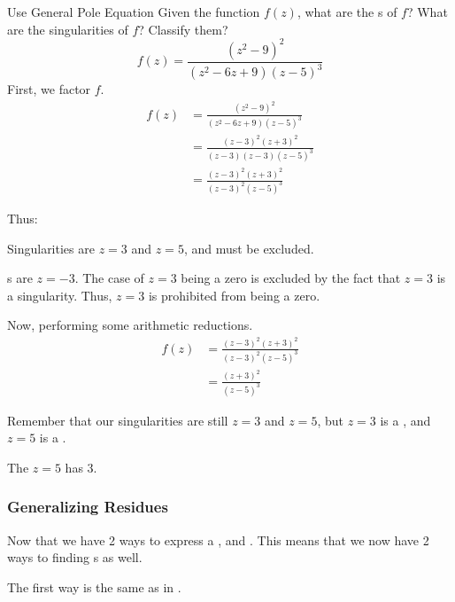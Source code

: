 \begin{example}{Use General Pole Equation}
  Given the function $f(z)$, what are the s of $f$? What are the singularities of $f$? Classify them?
  \begin{equation*}
    f(z) = \frac{{(z^{2} - 9)}^{2}}{(z^{2} - 6z + 9) {(z-5)}^{3}}
  \end{equation*}
  \tcblower{}
  First, we factor $f$.
  \begin{align*}
    f(z) &= \frac{{(z^{2} - 9)}^{2}}{(z^{2} - 6z + 9) {(z-5)}^{3}} \\
         &= \frac{{(z-3)}^{2} {(z+3)}^{2}}{(z-3) (z-3) {(z-5)}^{3}} \\
         &= \frac{{(z-3)}^{2} {(z+3)}^{2}}{{(z-3)}^{2} {(z-5)}^{3}}
  \end{align*}

  Thus:
  \begin{description}[noitemsep]
  \item Singularities are $z=3$ and $z=5$, and must be excluded.
  \item {}s are $z=-3$.
    The case of $z=3$ being a zero is excluded by the fact that $z=3$ is a singularity.
    Thus, $z=3$ is prohibited from being a zero.
  \end{description}

  Now, performing some arithmetic reductions.
  \begin{align*}
    f(z) &= \frac{{(z-3)}^{2} {(z+3)}^{2}}{{(z-3)}^{2} {(z-5)}^{3}} \\
         &= \frac{{(z+3)}^{2}}{{(z-5)}^{3}}
  \end{align*}

  Remember that our singularities are still $z=3$ and $z=5$, but $z=3$ is a  , and $z=5$ is a .

  The  $z=5$ has  3.
\end{example}

\subsubsection{Generalizing Residues}\label{subsubsec:Generalizing_Residues}
Now that we have 2 ways to express a ,  and .
This means that we now have 2 ways to finding s as well.

The first way is the same as in .

